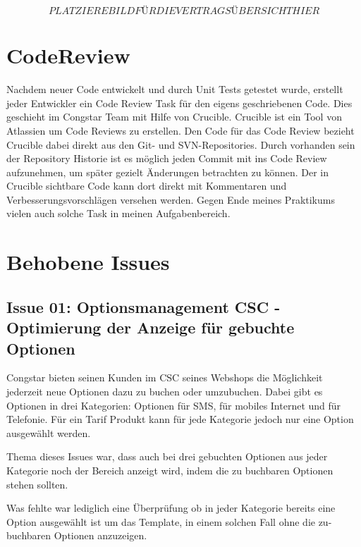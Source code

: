 \documentclass[11pt,a4paper]{article} %
\begin{document}
$$ PLATZIERE BILD FÜR DIE VERTRAGSÜBERSICHT HIER $$


\section{CodeReview}

Nachdem neuer Code entwickelt und durch Unit Tests getestet wurde, erstellt jeder Entwickler ein Code Review Task 
für den eigens geschriebenen Code. Dies geschieht im Congstar Team mit Hilfe von Crucible. Crucible ist ein Tool 
von Atlassien um Code Reviews zu erstellen. Den Code für das Code Review bezieht Crucible dabei direkt
aus den Git- und SVN-Repositories. Durch vorhanden sein der Repository Historie ist es möglich jeden Commit
mit ins Code Review aufzunehmen, um später gezielt Änderungen betrachten zu können. Der in Crucible sichtbare Code
kann dort direkt mit Kommentaren und Verbesserungsvorschlägen versehen werden.
Gegen Ende meines Praktikums vielen auch solche Task in meinen Aufgabenbereich.


\section{Behobene Issues} \label{sec:issues}

\subsection{Issue 01: Optionsmanagement CSC - Optimierung der Anzeige für gebuchte Optionen}

Congstar bieten seinen Kunden im CSC seines Webshops die Möglichkeit jederzeit neue Optionen dazu zu buchen oder umzubuchen.
Dabei gibt es Optionen in drei Kategorien: Optionen für SMS, für mobiles Internet und für Telefonie.
Für ein Tarif Produkt kann für jede Kategorie jedoch nur eine Option ausgewählt werden.

Thema dieses Issues war, dass auch bei drei gebuchten Optionen aus jeder Kategorie noch der Bereich anzeigt wird,
indem die zu buchbaren Optionen stehen sollten. 

Was fehlte war lediglich eine Überprüfung ob in jeder Kategorie bereits eine Option ausgewählt ist um das Template,
in einem solchen Fall ohne die zu-buchbaren Optionen anzuzeigen.
\end{document}
